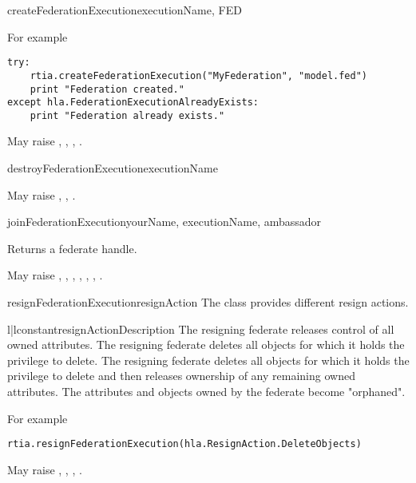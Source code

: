 \begin{methoddesc}{createFederationExecution}{executionName, FED}

For example
\begin{verbatim}
try:
    rtia.createFederationExecution("MyFederation", "model.fed")
    print "Federation created."
except hla.FederationExecutionAlreadyExists:
    print "Federation already exists."
\end{verbatim}

May raise
,
,
,
.
\end{methoddesc}

\begin{methoddesc}{destroyFederationExecution}{executionName}

May raise
,
,
.
\end{methoddesc}

\begin{methoddesc}{joinFederationExecution}{yourName, executionName, ambassador}

Returns a federate handle.

May raise
,
,
,
,
,
,
.
\end{methoddesc}

\begin{methoddesc}{resignFederationExecution}{resignAction}
The  class provides different resign actions.

\begin{tableii}{l|l}{constant}{resignAction}{Description}
    {The resigning federate releases control of all owned attributes.}
    {The resigning federate deletes all objects for which it holds the
    privilege to delete.}
    {The resigning federate deletes all objects for which it holds the
    privilege to delete and then releases ownership of any remaining
    owned attributes.}
    {The attributes and objects owned by the federate become "orphaned".}
\end{tableii}

For example
\begin{verbatim}
rtia.resignFederationExecution(hla.ResignAction.DeleteObjects)
\end{verbatim}

May raise
,
,
,
.
\end{methoddesc}


